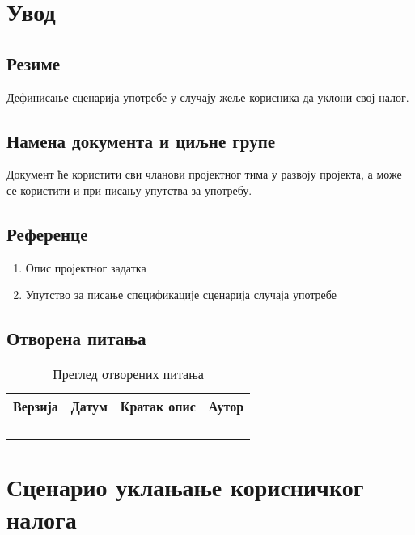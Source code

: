 \section{Увод}

\subsection{Резиме}
Дефинисање сценарија употребе у случају жеље корисника да уклони свој налог.

\subsection{Намена документа и циљне групе}
Документ ће користити сви чланови пројектног тима у развоју пројекта, а може се 
користити и при писању упутства за употребу.

\subsection{Референце}
\begin{enumerate}
	\item Опис пројектног задатка
	\item Упутство за писање спецификације сценарија случаја употребе
\end{enumerate}

\subsection{Отворена питања}
\begin{table}[h!]
\centering
	
	\begin{tabu}{ || X[l] | X[l] | X[l] | X[l] || }
	\hline
	\textbf{Верзија} & \textbf{Датум} & \textbf{Кратак опис} & \textbf{Аутор} \\
	\hline
	\hline
	& & &\\
	\hline
	& & &\\
	\hline
	& & &\\
	\hline
	& & &\\
	\hline
	\end{tabu}
	\caption{Преглед отворених питања}
	\label{table:2}
		
\end{table}



\section{Сценарио уклањање корисничког налога}


